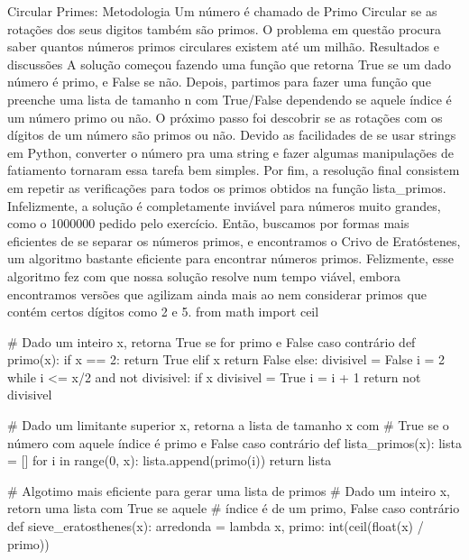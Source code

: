     Circular Primes:
        Metodologia
            Um número é chamado de Primo Circular se as rotações dos seus digitos também são primos. O problema em questão procura saber quantos números primos circulares existem até um milhão.
        Resultados e discussões
            A solução começou fazendo uma função que retorna True se um dado número é primo, e False se não. Depois, partimos para fazer uma função que preenche uma lista de tamanho n com True/False dependendo se aquele índice é um número primo ou não.
            O próximo passo foi descobrir se as rotações com os dígitos de um número são primos ou não. Devido as facilidades de se usar strings em Python, converter o número pra uma string e fazer algumas manipulações de fatiamento tornaram essa tarefa bem simples.
            Por fim, a resolução final consistem em repetir as verificações para todos os primos obtidos na função lista_primos. Infelizmente, a solução é completamente inviável para números muito grandes, como o 1000000 pedido pelo exercício. Então, buscamos por formas mais eficientes de se separar os números primos, e encontramos o Crivo de Eratóstenes, um algoritmo bastante eficiente para encontrar números primos. Felizmente, esse algoritmo fez com que nossa solução resolve num tempo viável, embora encontramos versões que agilizam ainda mais ao nem considerar primos que contém certos dígitos como 2 e 5.
            from math import ceil

            # Dado um inteiro x, retorna True se for primo e False caso contrário
            def primo(x):
                if x == 2:
                    return True
                elif x %
                    return False
                else:
                    divisivel = False
                    i = 2
                    while i <= x/2 and not divisivel:
                        if x %
                            divisivel = True
                        i = i + 1
                return not divisivel

            # Dado um limitante superior x, retorna a lista de tamanho x com
            # True se o número com aquele índice é primo e False caso contrário
            def lista_primos(x):
                lista = []
                for i in range(0, x):
                    lista.append(primo(i))
                return lista

            # Algotimo mais eficiente para gerar uma lista de primos
            # Dado um inteiro x, retorn uma lista com True se aquele 
            # índice é de um primo, False caso contrário
            def sieve_eratosthenes(x):
                arredonda = lambda x, primo: int(ceil(float(x) / primo))


